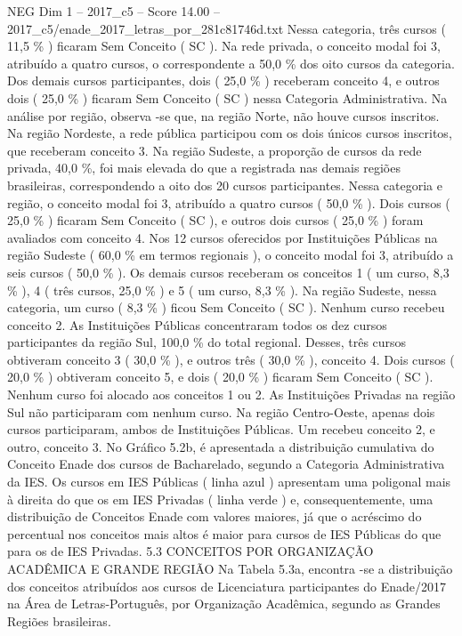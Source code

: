 \begin{textsample}{NEG Dim 1 – 2017\_c5 – Score 14.00 – 2017\_c5/enade\_2017\_letras\_por\_281c81746d.txt}
Nessa categoria, três cursos ( 11,5 \% ) ficaram Sem Conceito ( SC ).
Na rede privada, o conceito modal foi 3, atribuído a quatro cursos, o correspondente a 50,0 \% dos oito cursos da categoria.
Dos demais cursos participantes, dois ( 25,0 \% ) receberam conceito 4, e outros dois ( 25,0 \% ) ficaram Sem Conceito ( SC ) nessa Categoria Administrativa.
Na análise por região, observa -se que, na região Norte, não houve cursos inscritos.
Na região Nordeste, a rede pública participou com os dois únicos cursos inscritos, que receberam conceito 3.
Na região Sudeste, a proporção de cursos da rede privada, 40,0 \%, foi mais elevada do que a registrada nas demais regiões brasileiras, correspondendo a oito dos 20 cursos participantes.
Nessa categoria e região, o conceito modal foi 3, atribuído a quatro cursos ( 50,0 \% ).
Dois cursos ( 25,0 \% ) ficaram Sem Conceito ( SC ), e outros dois cursos ( 25,0 \% ) foram avaliados com conceito 4.
Nos 12 cursos oferecidos por Instituições Públicas na região Sudeste ( 60,0 \% em termos regionais ), o conceito modal foi 3, atribuído a seis cursos ( 50,0 \% ).
Os demais cursos receberam os conceitos 1 ( um curso, 8,3 \% ), 4 ( três cursos, 25,0 \% ) e 5 ( um curso, 8,3 \% ).
Na região Sudeste, nessa categoria, um curso ( 8,3 \% ) ficou Sem Conceito ( SC ).
Nenhum curso recebeu conceito 2.
As Instituições Públicas concentraram todos os dez cursos participantes da região Sul, 100,0 \% do total regional.
Desses, três cursos obtiveram conceito 3 ( 30,0 \% ), e outros três ( 30,0 \% ), conceito 4.
Dois cursos ( 20,0 \% ) obtiveram conceito 5, e dois ( 20,0 \% ) ficaram Sem Conceito ( SC ).
Nenhum curso foi alocado aos conceitos 1 ou 2.
As Instituições Privadas na região Sul não participaram com nenhum curso.
Na região Centro-Oeste, apenas dois cursos participaram, ambos de Instituições Públicas.
Um recebeu conceito 2, e outro, conceito 3.
No Gráfico 5.2b, é apresentada a distribuição cumulativa do Conceito Enade dos cursos de Bacharelado, segundo a Categoria Administrativa da IES.
Os cursos em IES Públicas ( linha azul ) apresentam uma poligonal mais à direita do que os em IES Privadas ( linha verde ) e, consequentemente, uma distribuição de Conceitos Enade com valores maiores, já que o acréscimo do percentual nos conceitos mais altos é maior para cursos de IES Públicas do que para os de IES Privadas. 5.3 CONCEITOS POR ORGANIZAÇÃO ACADÊMICA E GRANDE REGIÃO Na Tabela 5.3a, encontra -se a distribuição dos conceitos atribuídos aos cursos de Licenciatura participantes do Enade/2017 na Área de Letras-Português, por Organização Acadêmica, segundo as Grandes Regiões brasileiras.

\end{textsample}
